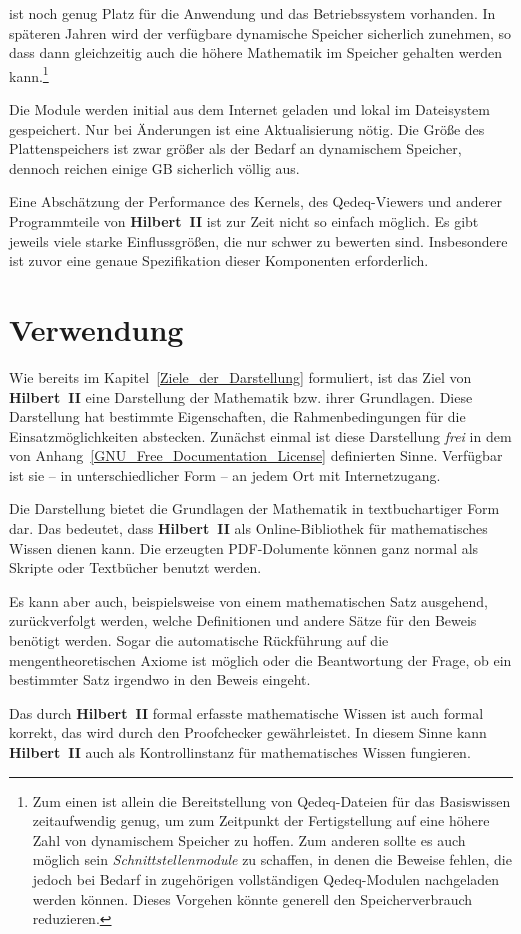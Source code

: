 \documentclass[a4paper,german,10pt,twoside]{book}
\begin{document}
{ist noch genug Platz f{\"u}r die Anwendung und das Betriebssystem vorhanden. In sp{\"a}teren Jahren wird
der verf{\"u}gbare dynamische Speicher sicherlich zunehmen, so dass dann gleichzeitig auch die h{\"o}here
Mathematik im Speicher gehalten werden kann.\footnote{Zum einen ist allein die Bereitstellung von
Qedeq-Dateien f{\"u}r das Basiswissen zeitaufwendig genug, um zum Zeitpunkt der Fertigstellung auf eine
h{\"o}here Zahl von dynamischem Speicher zu hoffen. Zum anderen sollte es auch m{\"o}glich sein
\emph{Schnittstellenmodule} zu schaffen, in denen die Beweise fehlen,
die jedoch bei Bedarf in zugeh{\"o}rigen vollst{\"a}ndigen Qedeq-Modulen nachgeladen werden k{\"o}nnen. Dieses
Vorgehen k{\"o}nnte generell den Speicherverbrauch reduzieren.}
\par
Die Module werden initial aus dem Internet geladen und lokal im Dateisystem gespeichert. Nur bei
{\"A}nderungen ist eine Aktualisierung n{\"o}tig. Die Gr{\"o}{\ss}e des Plattenspeichers ist zwar gr{\"o}{\ss}er als der
Bedarf an dynamischem Speicher, dennoch reichen einige GB sicherlich v{\"o}llig aus.
\par
Eine Absch{\"a}tzung der Performance des Kernels, des Qedeq-Viewers und anderer Programmteile von
\textbf{Hilbert~II} ist zur Zeit nicht so einfach m{\"o}glich. Es gibt jeweils viele starke
Einflussgr{\"o}{\ss}en, die nur schwer zu bewerten sind. Insbesondere ist zuvor eine genaue Spezifikation
dieser Komponenten erforderlich.

\section{Verwendung}
Wie bereits im Kapitel~\ref{Ziele_der_Darstellung} formuliert, ist das Ziel von \textbf{Hilbert~II}
eine Darstellung der Mathematik bzw. ihrer Grundlagen. Diese Darstellung hat bestimmte
Eigenschaften, die Rahmenbedingungen f{\"u}r die Einsatzm{\"o}glichkeiten abstecken. Zun{\"a}chst einmal ist
diese Darstellung \emph{frei} in dem von Anhang~\ref{GNU_Free_Documentation_License} definierten
Sinne. Verf{\"u}gbar ist sie -- in unterschiedlicher Form -- an jedem Ort mit Internetzugang.
\par
Die Darstellung bietet die Grundlagen der Mathematik in textbuchartiger Form dar. Das bedeutet,
dass \textbf{Hilbert~II} als Online-Bibliothek f{\"u}r mathematisches Wissen dienen kann. Die erzeugten
PDF-Dolumente k{\"o}nnen ganz normal als Skripte oder Textb{\"u}cher benutzt werden.
\par
Es kann aber auch, beispielsweise von einem mathematischen Satz ausgehend, zur{\"u}ckverfolgt werden,
welche Definitionen und andere S{\"a}tze f{\"u}r den Beweis ben{\"o}tigt werden. Sogar die automatische
R{\"u}ckf{\"u}hrung auf die mengentheoretischen Axiome ist m{\"o}glich oder die Beantwortung der Frage, ob ein
bestimmter Satz irgendwo in den Beweis eingeht.
\par
Das durch \textbf{Hilbert~II} formal erfasste mathematische Wissen ist auch formal korrekt, das
wird durch den Proofchecker gew{\"a}hrleistet. In diesem Sinne kann \textbf{Hilbert~II} auch als
Kontrollinstanz f{\"u}r mathematisches Wissen fungieren.

}
\end{document}
